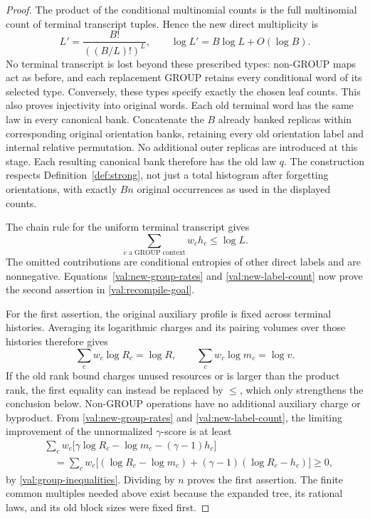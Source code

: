 \begin{proof}
The product of the conditional multinomial counts is the full multinomial
count of terminal transcript tuples.  Hence the new direct multiplicity is
\begin{equation}
 L'=\frac{B!}{((B/L)!)^L},\qquad
 \log L'=B\log L+O(\log B).
\label{val:new-label-count}
\end{equation}
No terminal transcript is lost beyond these prescribed types: non-GROUP
maps act as before, and each replacement GROUP retains every conditional
word of its selected type.  Conversely, these types specify exactly the
chosen leaf counts.  This also proves injectivity into original words.
Each old terminal word has the same law in every canonical bank.
Concatenate the $B$ already banked replicas within corresponding original
orientation banks, retaining every old orientation label and internal
relative permutation.  No additional outer replicas are introduced at this
stage.  Each resulting canonical bank therefore has the old law $q$.
The construction respects Definition~\ref{def:strong}, not just a total
histogram after forgetting orientations, with exactly $Bn$ original
occurrences as used in the displayed counts.

The chain rule for the uniform terminal transcript gives
\begin{equation}
 \sum_{c\text{ a GROUP context}}w_ch_c\le\log L.
\label{val:group-chain-rule}
\end{equation}
The omitted contributions are conditional entropies of other direct labels
and are nonnegative.  Equations~\eqref{val:new-group-rates} and
\eqref{val:new-label-count} now prove the second assertion in
\eqref{val:recompile-goal}.

For the first assertion, the original auxiliary profile is fixed across
terminal histories.  Averaging its logarithmic charges and its pairing
volumes over those histories therefore gives
\[
 \sum_c w_c\log R_c=\log R,\qquad
 \sum_c w_c\log m_c=\log v.
\]
If the old rank bound charges unused resources or is larger than the product
rank, the first equality can instead be replaced by $\le$, which only
strengthens the conclusion below.  Non-GROUP operations have no additional
auxiliary charge or byproduct.  From \eqref{val:new-group-rates} and
\eqref{val:new-label-count}, the limiting improvement of the unnormalized
$\gamma$-score is at least
\begin{align*}
 &\sum_c w_c\bigl[
       \gamma\log R_c-\log m_c-(\gamma-1)h_c\bigr]\\
 &\quad=\sum_c w_c\bigl[
       (\log R_c-\log m_c)
       +(\gamma-1)(\log R_c-h_c)\bigr]\ge0,
\end{align*}
by \eqref{val:group-inequalities}.  Dividing by $n$ proves the first
assertion.  The finite common multiples needed above exist because the
expanded tree, its rational laws, and its old block sizes were fixed first.
\end{proof}


